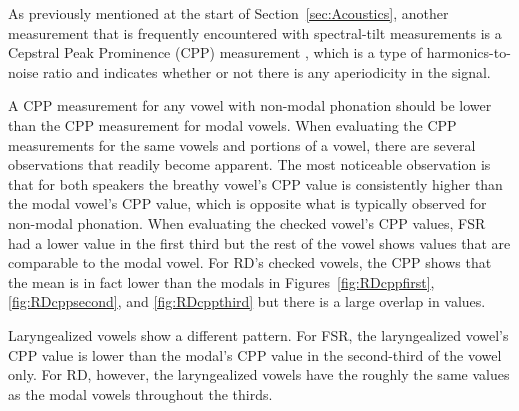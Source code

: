 \documentclass[12pt, letterpaper]{article}
\begin{document}
As previously mentioned at the start of Section~\ref{sec:Acoustics}, another measurement that is frequently encountered with spectral-tilt measurements is a Cepstral Peak Prominence (CPP) measurement \citep{hillenbrandAcousticCorrelatesBreathy1994}, which is a type of harmonics-to-noise ratio and indicates whether or not there is any aperiodicity in the signal. 

A CPP measurement for any vowel with non-modal phonation should be lower than the CPP measurement for modal vowels. When evaluating the CPP measurements for the same vowels and portions of a vowel, there are several observations that readily become apparent. The most noticeable observation is that for both speakers the breathy vowel's CPP value is consistently higher than the modal vowel's CPP value, which is opposite what is typically observed for non-modal phonation. When evaluating the checked vowel's CPP values, FSR had a lower value in the first third but the rest of the vowel shows values that are comparable to the modal vowel. For RD's checked vowels, the CPP shows that the mean is in fact lower than the modals in Figures~\ref{fig:RDcppfirst}, \ref{fig:RDcppsecond}, and \ref{fig:RDcppthird} but there is a large overlap in values. 

Laryngealized vowels show a different pattern. For FSR, the laryngealized vowel's CPP value is lower than the modal's CPP value in the second-third of the vowel only. For RD, however, the laryngealized vowels have the roughly the same values as the modal vowels throughout the thirds. 
\end{document}

